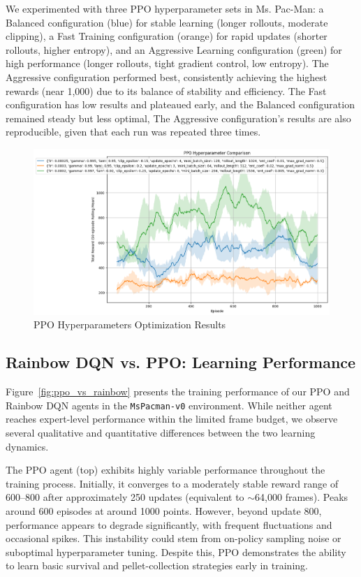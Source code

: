 \documentclass{article}
\begin{document}
We experimented with three PPO hyperparameter sets in Ms. Pac-Man: a Balanced configuration (blue) for stable learning (longer rollouts, moderate clipping), a Fast Training configuration (orange) for rapid updates (shorter rollouts, higher entropy), and an Aggressive Learning configuration (green) for high performance (longer rollouts, tight gradient control, low entropy). The Aggressive configuration performed best, consistently achieving the highest rewards (near 1,000) due to its balance of stability and efficiency. The Fast configuration has low results and plateaued early, and the Balanced configuration remained steady but less optimal, The Aggressive configuration’s results are also reproducible, given that each run was repeated three times.

\begin{figure}[h]
  \centering
  \includegraphics[width=\linewidth]{PPO_output_hyperparameters_3set.png}
  \caption{PPO Hyperparameters Optimization Results}
  \label{fig:ppo_hyperparams}
\end{figure}

\subsection{Rainbow DQN vs. PPO: Learning Performance}

Figure~\ref{fig:ppo_vs_rainbow} presents the training performance of our PPO and Rainbow DQN agents in the \texttt{MsPacman-v0} environment. While neither agent reaches expert-level performance within the limited frame budget, we observe several qualitative and quantitative differences between the two learning dynamics.

The PPO agent (top) exhibits highly variable performance throughout the training process. Initially, it converges to a moderately stable reward range of 600–800 after approximately 250 updates (equivalent to $\sim$64,000 frames). Peaks around 600 episodes at around 1000 points. However, beyond update 800, performance appears to degrade significantly, with frequent fluctuations and occasional spikes. This instability could stem from on-policy sampling noise or suboptimal hyperparameter tuning. Despite this, PPO demonstrates the ability to learn basic survival and pellet-collection strategies early in training.
\end{document}
